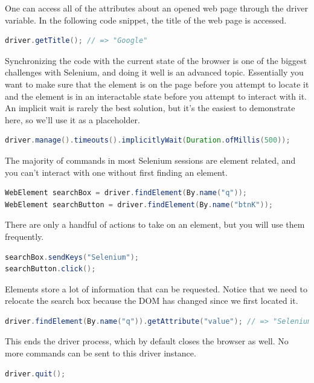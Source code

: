 One can access all of the attributes about an opened web page through the driver variable. In the following code snippet, the title of the web page is accessed.
\begin{lstlisting}[language=java]
driver.getTitle(); // => "Google"
\end{lstlisting}

Synchronizing the code with the current state of the browser is one of the biggest challenges with Selenium, and doing it well is an advanced topic. Essentially you want to make sure that the element is on the page before you attempt to locate it and the element is in an interactable state before you attempt to interact with it. An implicit wait is rarely the best solution, but it’s the easiest to demonstrate here, so we’ll use it as a placeholder.
\begin{lstlisting}[language=java]
driver.manage().timeouts().implicitlyWait(Duration.ofMillis(500));
\end{lstlisting}

The majority of commands in most Selenium sessions are element related, and you can’t interact with one without first finding an element.
\begin{lstlisting}[language=java]
WebElement searchBox = driver.findElement(By.name("q"));
WebElement searchButton = driver.findElement(By.name("btnK"));
\end{lstlisting}

There are only a handful of actions to take on an element, but you will use them frequently.
\begin{lstlisting}[language=java]
searchBox.sendKeys("Selenium");
searchButton.click();
\end{lstlisting}

Elements store a lot of information that can be requested. Notice that we need to relocate the search box because the DOM has changed since we first located it.
\begin{lstlisting}[language=java]
driver.findElement(By.name("q")).getAttribute("value"); // => "Selenium"
\end{lstlisting}

This ends the driver process, which by default closes the browser as well. No more commands can be sent to this driver instance.
\begin{lstlisting}[language=java]
driver.quit();
\end{lstlisting}

